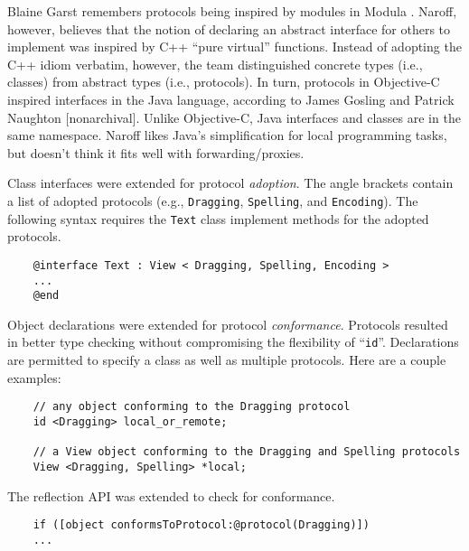 \documentclass[acmsmall]{acmart}\settopmatter{}
\begin{document}
Blaine Garst remembers protocols being inspired by modules in Modula \citep[22--25, 54]{garst_oral_2016}. Naroff, however, believes that the notion of declaring an abstract interface for others to implement was inspired by C++ ``pure virtual'' functions. Instead of adopting the C++ idiom verbatim, however, the team distinguished concrete types (i.e., classes) from abstract types (i.e., protocols). In turn, protocols in Objective-C inspired interfaces in the Java language, according to James Gosling \citep[13--14]{gosling_oral_2019} and Patrick Naughton \citep{cox_java_nodate}[nonarchival]. Unlike Objective-C, Java interfaces and classes are in the same namespace. Naroff likes Java's simplification for local programming tasks, but doesn't think it fits well with forwarding/proxies. 

Class interfaces were extended for protocol \emph{adoption}. The angle brackets contain a list of adopted protocols (e.g., \verb$Dragging$, \verb$Spelling$, and \verb$Encoding$). The following syntax requires the \verb$Text$ class implement methods for the adopted protocols. 
\begin{verbatim}
    @interface Text : View < Dragging, Spelling, Encoding >
    ...
    @end
\end{verbatim}
Object declarations were extended for protocol \emph{conformance}. Protocols resulted in better type checking without compromising the flexibility of ``\verb$id$''. Declarations are permitted to specify a class as well as multiple protocols. Here are a couple examples:
\begin{verbatim}
    // any object conforming to the Dragging protocol
    id <Dragging> local_or_remote; 

    // a View object conforming to the Dragging and Spelling protocols
    View <Dragging, Spelling> *local; 
\end{verbatim}
The reflection API was extended to check for conformance.
\begin{verbatim}
    if ([object conformsToProtocol:@protocol(Dragging)])
    ...
\end{verbatim}
\end{document}
